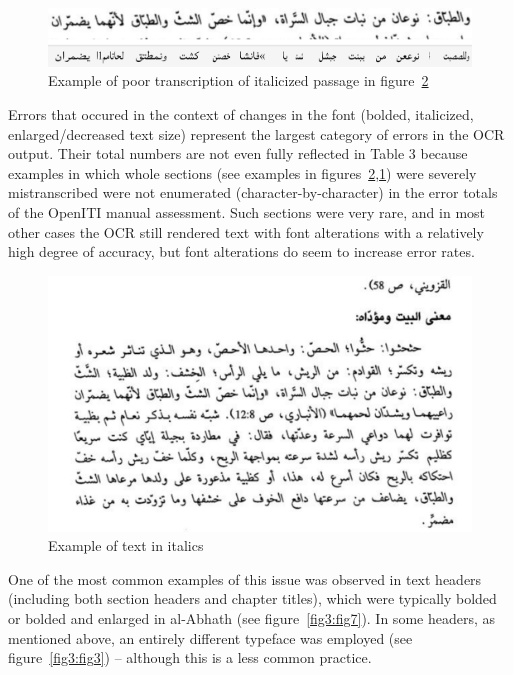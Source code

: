 \begin{figure}[h!tp]
	\includegraphics[width=\linewidth]{images/image6.png}
	\caption{Example of poor transcription of italicized passage in figure~\protect\ref{fig3:fig5}}
	\label{fig3:fig6}
\end{figure}


Errors that occured in the context of changes in the font (bolded, italicized,
enlarged/decreased text size) represent the largest category of errors in the
OCR output. Their total numbers are not even fully reflected in Table 3 because
examples in which whole sections (see examples in figures~\ref{fig3:fig5},\ref{fig3:fig6}) were severely
mistranscribed were not enumerated (character-by-character) in the error totals
of the OpenITI manual assessment. Such sections were very rare, and in most
other cases the OCR still rendered text with font alterations with a relatively
high degree of accuracy, but font alterations do seem to increase error rates.

\begin{figure}[h!tp]
	\includegraphics[width=\linewidth]{images/image19.png}
	\caption{Example of text in italics}
	\label{fig3:fig5}
\end{figure}

One of the most common examples of this issue was observed in text headers
(including both section headers and chapter titles), which were typically
bolded or bolded and enlarged in al-Abhath (see figure~\ref{fig3:fig7}). In some
headers, as mentioned above, an entirely different typeface was employed (see
figure~\ref{fig3:fig3}) -- although this is a less common practice.

